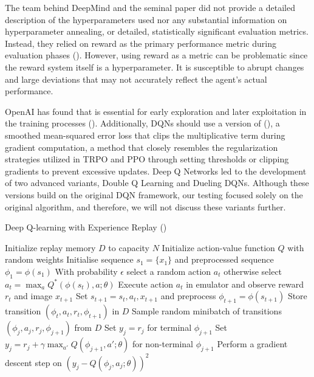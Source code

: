             \noindent The team behind DeepMind and the seminal paper did not provide a detailed description of the hyperparameters used nor any substantial information on hyperparameter annealing, or detailed, statistically significant evaluation metrics. Instead, they relied on reward as the primary performance metric during evaluation phases (\textcolor{deepblue}{\cite{mnih2013playing}}). However, using reward as a metric can be problematic since the reward system itself is a hyperparameter. It is susceptible to abrupt changes and large deviations that may not accurately reflect the agent's actual performance. 
            
            \bigskip
            
            \noindent OpenAI has found that  is essential for early exploration and later exploitation in the training processes (\textcolor{deepblue}{\cite{baselines}}). Additionally, DQNs should use a version of  (\textcolor{deepblue}{\cite{wiki:Huber_loss}}), a smoothed mean-squared error loss that clips the multiplicative term during gradient computation, a method that closely resembles the regularization strategies utilized in TRPO and PPO through setting thresholds or clipping gradients to prevent excessive updates. Deep Q Networks led to the development of two advanced variants, Double Q Learning and Dueling DQNs. Although these versions build on the original DQN framework, our testing focused solely on the original algorithm, and therefore, we will not discuss these variants further.

            \begin{algorithm}[htbp]
            \caption{Deep Q-learning with Experience Replay (\cite{mnih2013playing})}
            \begin{algorithmic}[1]
            \State Initialize replay memory $D$ to capacity $N$
            \State Initialize action-value function $Q$ with random weights
                \State Initialise sequence $s_1 = \{x_1\}$ and preprocessed sequence $\phi_1 = \phi(s_1)$
                    \State With probability $\epsilon$ select a random action $a_t$
                    \State otherwise select $a_t = \max_a Q^*(\phi(s_t), a; \theta)$
                    \State Execute action $a_t$ in emulator and observe reward $r_t$ and image $x_{t+1}$
                    \State Set $s_{t+1} = s_t, a_t, x_{t+1}$ and preprocess $\phi_{t+1} = \phi(s_{t+1})$
                    \State Store transition $(\phi_t, a_t, r_t, \phi_{t+1})$ in $D$
                    \State Sample random minibatch of transitions $(\phi_j , a_j , r_j , \phi_{j+1})$ from $D$
                    \State Set $y_j = r_j$ for terminal $\phi_{j+1}$
                    \State Set $y_j = r_j + \gamma \max_{a'} Q(\phi_{j+1}, a'; \theta)$ for non-terminal $\phi_{j+1}$
                    \State Perform a gradient descent step on $(y_j - Q(\phi_j , a_j ; \theta))^2$
                \EndFor
            \EndFor
            \end{algorithmic}
            \end{algorithm}

